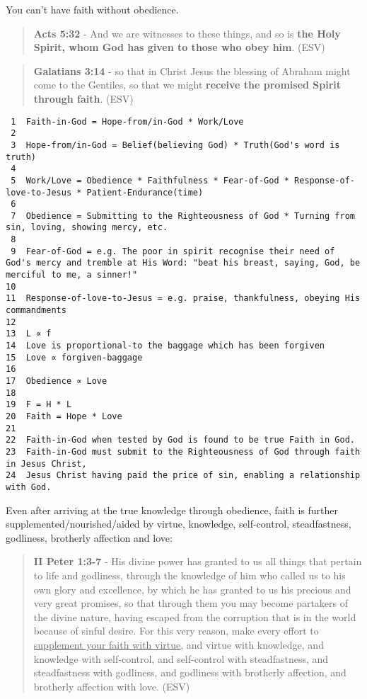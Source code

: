 \documentclass[11pt]{article}
\begin{document}
You can't have faith without obedience.

\begin{quote}
\textbf{Acts 5:32} - And we are witnesses to these things, and so is \textbf{the Holy Spirit, whom God has given to those who obey him}. (ESV)
\end{quote}

\begin{quote}
\textbf{Galatians 3:14} - so that in Christ Jesus the blessing of Abraham might come to the Gentiles, so that we might \textbf{receive the promised Spirit through faith}. (ESV)
\end{quote}

\begin{verbatim}
 1  Faith-in-God = Hope-from/in-God * Work/Love
 2  
 3  Hope-from/in-God = Belief(believing God) * Truth(God's word is truth)
 4  
 5  Work/Love = Obedience * Faithfulness * Fear-of-God * Response-of-love-to-Jesus * Patient-Endurance(time)
 6  
 7  Obedience = Submitting to the Righteousness of God * Turning from sin, loving, showing mercy, etc.
 8  
 9  Fear-of-God = e.g. The poor in spirit recognise their need of God's mercy and tremble at His Word: "beat his breast, saying, God, be merciful to me, a sinner!"
10  
11  Response-of-love-to-Jesus = e.g. praise, thankfulness, obeying His commandments
12  
13  L ∝ f
14  Love is proportional-to the baggage which has been forgiven
15  Love ∝ forgiven-baggage
16  
17  Obedience ∝ Love
18  
19  F = H * L
20  Faith = Hope * Love
21  
22  Faith-in-God when tested by God is found to be true Faith in God.
23  Faith-in-God must submit to the Righteousness of God through faith in Jesus Christ,
24  Jesus Christ having paid the price of sin, enabling a relationship with God.
\end{verbatim}

Even after arriving at the true knowledge through obedience, faith is further supplemented/nourished/aided by virtue, knowledge, self-control, steadfastness, godliness, brotherly affection and love:

\begin{quote}
\textbf{II Peter 1:3-7} - His divine power has granted to us all things that pertain to life and godliness, through the knowledge of him who called us to his own glory and excellence, by which he has granted to us his precious and very great promises, so that through them you may become partakers of the divine nature, having escaped from the corruption that is in the world because of sinful desire. For this very reason, make every effort to \uline{supplement your faith with virtue}, and virtue with knowledge, and knowledge with self-control, and self-control with steadfastness, and steadfastness with godliness, and godliness with brotherly affection, and brotherly affection with love. (ESV)
\end{quote}
\end{document}
